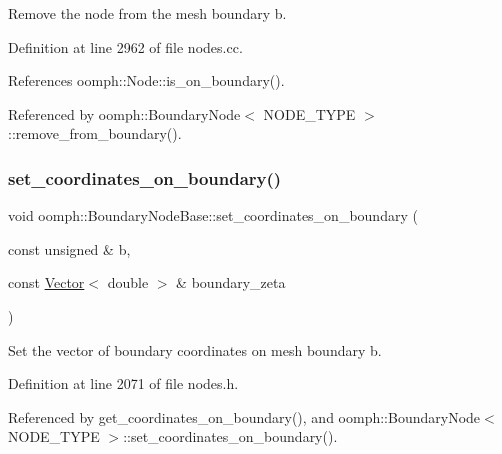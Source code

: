 Remove the node from the mesh boundary b. 



Definition at line 2962 of file nodes.\+cc.



References oomph\+::\+Node\+::is\+\_\+on\+\_\+boundary().



Referenced by oomph\+::\+Boundary\+Node$<$ N\+O\+D\+E\+\_\+\+T\+Y\+P\+E $>$\+::remove\+\_\+from\+\_\+boundary().

\mbox{\label{classoomph_1_1BoundaryNodeBase_a2dfc687fb793ef32693282a08c012d30}} 
\subsubsection{\texorpdfstring{set\+\_\+coordinates\+\_\+on\+\_\+boundary()}{set\_coordinates\_on\_boundary()}\hspace{0.1cm}{\footnotesize\ttfamily [1/2]}}
{\footnotesize\ttfamily void oomph\+::\+Boundary\+Node\+Base\+::set\+\_\+coordinates\+\_\+on\+\_\+boundary (\begin{DoxyParamCaption}\item[{const unsigned \&}]{b,  }\item[{const \hyperlink{classoomph_1_1Vector}{Vector}$<$ double $>$ \&}]{boundary\+\_\+zeta }\end{DoxyParamCaption})\hspace{0.3cm}{\ttfamily [inline]}}



Set the vector of boundary coordinates on mesh boundary b. 



Definition at line 2071 of file nodes.\+h.



Referenced by get\+\_\+coordinates\+\_\+on\+\_\+boundary(), and oomph\+::\+Boundary\+Node$<$ N\+O\+D\+E\+\_\+\+T\+Y\+P\+E $>$\+::set\+\_\+coordinates\+\_\+on\+\_\+boundary().

\mbox{\label{classoomph_1_1BoundaryNodeBase_a45d53bb02ccf50ab551d051b5e2d4777}} 
